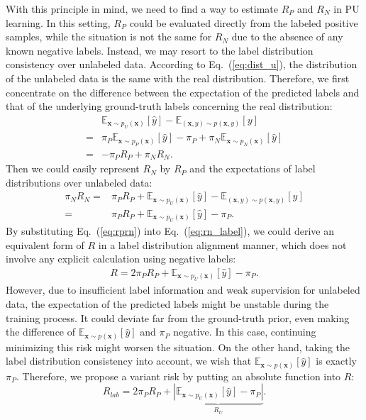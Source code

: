 \documentclass[final]{cvpr}
\newcommand{\examplex}{\bm{x}}
\newcommand{\expectation}[1]{\mathbb{E}_{#1}}
\newcommand{\bangyan}[1]{#1}
\newcommand{\yunrui}[1]{#1}
\begin{document}
\bangyan{With this principle in mind, we need to find a way to estimate $R_P$ and $R_N$ in PU learning.} In this setting, $R_{P}$ could be evaluated directly from the labeled positive samples, while the situation is not the same for $R_{N}$ due to the absence of any known negative labels. \bangyan{Instead, we may resort to} the label distribution consistency over unlabeled data. According to Eq.~(\ref{eq:dist_u}), \yunrui{the distribution of the unlabeled data is the same with the real distribution. Therefore,} we first concentrate on the difference between the expectation of the predicted labels and that of the underlying ground-truth labels \yunrui{concerning the real distribution}:
\begin{align}
    & \expectation{\examplex \sim p_U(\examplex)} \left[ \hat{y} \right] - \expectation{(\examplex,y) \sim p(\examplex,y)}  \left[ y \right] \nonumber \\ = & \pi_{P}  \expectation{\examplex \sim p_{P}(\examplex)} \left[ \hat{y} \right] - \pi_{P} \nonumber + \pi_{N} \expectation{\examplex \sim p_{N}(\examplex)} \left[ \hat{y} \right] \nonumber \\
        = &  -\pi_{P} R_{P} + \pi_{N} R_{N}.
\end{align}
Then we could \bangyan{easily represent $R_{N}$ by $R_{P}$ and the expectations of label distributions over unlabeled data}:
\begin{align}
    \pi_{N} R_{N} = & \pi_{P} R_{P} + \expectation{\examplex \sim p_U(\examplex)} \left[ \hat{y} \right] - \expectation{(\examplex,y) \sim p(\examplex,y)} \left[ y \right] \nonumber \\ 
    = & \pi_{P} R_{P} + \expectation{\examplex \sim p_U(\examplex)} \left[ \hat{y} \right] - \pi_{P} . \label{eq:rn_label}
\end{align}
\bangyan{By substituting Eq.~(\ref{eq:rprn}) into Eq.~(\ref{eq:rn_label}), we could derive an} equivalent form of $R$ in a label distribution alignment manner, \bangyan{which does not involve any explicit calculation using negative labels}:
\begin{align}
    R = 2\pi_{P} R_{P} + \expectation{\examplex \sim p_U(\examplex)} \left[ \hat{y} \right] - \pi_{P}.
\end{align}
However, \yunrui{due to} insufficient label information and weak supervision for unlabeled data, the expectation of the predicted labels \yunrui{might be unstable during the training process}. It could deviate far from the ground-truth prior, \yunrui{even making the difference of $\expectation{\examplex \sim p(\examplex)} \left[ \hat{y} \right]$ and $\pi_{P}$ negative.} \bangyan{In this case, continuing minimizing this risk might worsen the situation. On the other hand, taking the label distribution consistency into account,} we \bangyan{wish} that $\expectation{\examplex \sim p(\examplex)} \left[ \hat{y} \right]$ is \yunrui{exactly} $\pi_{P}$. Therefore, we propose a variant risk by putting an absolute function into $R$:
\begin{equation}
    R_{lab} = 2\pi_{P} R_{P} + \underbrace{ \left| \expectation{\examplex \sim p_U(\examplex)} \left[ \hat{y} \right] - \pi_{P} \right|}_{R_{U}}.
\end{equation}
\end{document}
